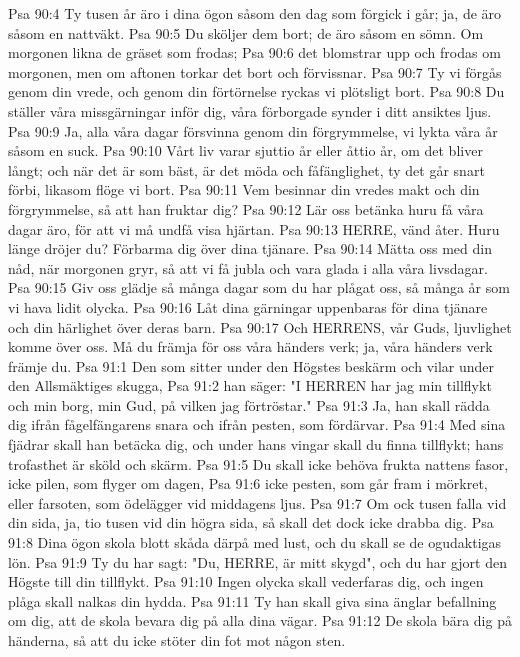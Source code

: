 Psa 90:4  Ty tusen år äro i dina ögon såsom den dag som förgick i går; ja, de äro såsom en nattväkt.
Psa 90:5  Du sköljer dem bort; de äro såsom en sömn. Om morgonen likna de gräset som frodas;
Psa 90:6  det blomstrar upp och frodas om morgonen, men om aftonen torkar det bort och förvissnar.
Psa 90:7  Ty vi förgås genom din vrede, och genom din förtörnelse ryckas vi plötsligt bort.
Psa 90:8  Du ställer våra missgärningar inför dig, våra förborgade synder i ditt ansiktes ljus.
Psa 90:9  Ja, alla våra dagar försvinna genom din förgrymmelse, vi lykta våra år såsom en suck.
Psa 90:10  Vårt liv varar sjuttio år eller åttio år, om det bliver långt; och när det är som bäst, är det möda och fåfänglighet, ty det går snart förbi, likasom flöge vi bort.
Psa 90:11  Vem besinnar din vredes makt och din förgrymmelse, så att han fruktar dig?
Psa 90:12  Lär oss betänka huru få våra dagar äro, för att vi må undfå visa hjärtan.
Psa 90:13  HERRE, vänd åter. Huru länge dröjer du? Förbarma dig över dina tjänare.
Psa 90:14  Mätta oss med din nåd, när morgonen gryr, så att vi få jubla och vara glada i alla våra livsdagar.
Psa 90:15  Giv oss glädje så många dagar som du har plågat oss, så många år som vi hava lidit olycka.
Psa 90:16  Låt dina gärningar uppenbaras för dina tjänare och din härlighet över deras barn.
Psa 90:17  Och HERRENS, vår Guds, ljuvlighet komme över oss. Må du främja för oss våra händers verk; ja, våra händers verk främje du.
Psa 91:1  Den som sitter under den Högstes beskärm och vilar under den Allsmäktiges skugga,
Psa 91:2  han säger: "I HERREN har jag min tillflykt och min borg, min Gud, på vilken jag förtröstar."
Psa 91:3  Ja, han skall rädda dig ifrån fågelfängarens snara och ifrån pesten, som fördärvar.
Psa 91:4  Med sina fjädrar skall han betäcka dig, och under hans vingar skall du finna tillflykt; hans trofasthet är sköld och skärm.
Psa 91:5  Du skall icke behöva frukta nattens fasor, icke pilen, som flyger om dagen,
Psa 91:6  icke pesten, som går fram i mörkret, eller farsoten, som ödelägger vid middagens ljus.
Psa 91:7  Om ock tusen falla vid din sida, ja, tio tusen vid din högra sida, så skall det dock icke drabba dig.
Psa 91:8  Dina ögon skola blott skåda därpå med lust, och du skall se de ogudaktigas lön.
Psa 91:9  Ty du har sagt: "Du, HERRE, är mitt skygd", och du har gjort den Högste till din tillflykt.
Psa 91:10  Ingen olycka skall vederfaras dig, och ingen plåga skall nalkas din hydda.
Psa 91:11  Ty han skall giva sina änglar befallning om dig, att de skola bevara dig på alla dina vägar.
Psa 91:12  De skola bära dig på händerna, så att du icke stöter din fot mot någon sten.

